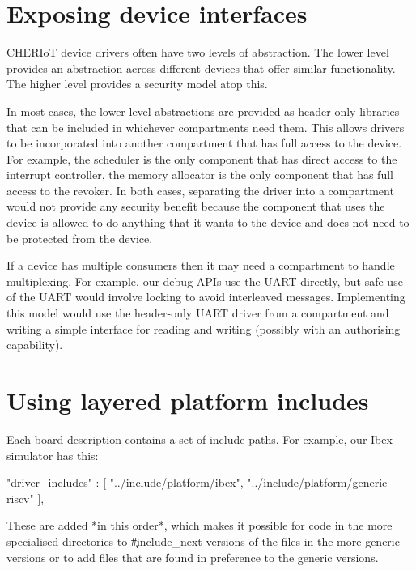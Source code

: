 \section{Exposing device interfaces}

CHERIoT device drivers often have two levels of abstraction.
The lower level provides an abstraction across different devices that offer similar functionality.
The higher level provides a security model atop this.

In most cases, the lower-level abstractions are provided as header-only libraries that can be included in whichever compartments need them.
This allows drivers to be incorporated into another compartment that has full access to the device.
For example, the scheduler is the only component that has direct access to the interrupt controller, the memory allocator is the only component that has full access to the revoker.
In both cases, separating the driver into a compartment would not provide any security benefit because the component that uses the device is allowed to do anything that it wants to the device and does not need to be protected from the device.

If a device has multiple consumers then it may need a compartment to handle multiplexing.
For example, our debug APIs use the UART directly, but safe use of the UART would involve locking to avoid interleaved messages.
Implementing this model would use the header-only UART driver from a compartment and writing a simple interface for reading and writing (possibly with an authorising capability).

\section{Using layered platform includes}

Each board description contains a set of include paths.
For example, our Ibex simulator has this:

\begin{jsonsnippet}
    "driver_includes" : [
        "../include/platform/ibex",
        "../include/platform/generic-riscv"
    ],
\end{jsonsnippet}

These are added *in this order*, which makes it possible for code in the more specialised directories to \c{#include_next} versions of the files in the more generic versions or to add files that are found in preference to the generic versions.

